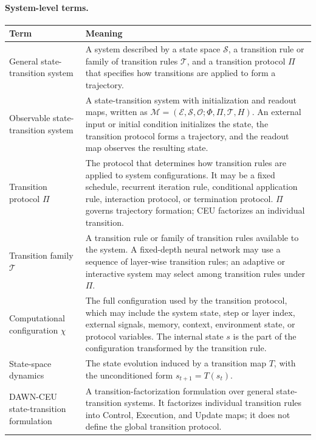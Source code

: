 \documentclass{article}
\begin{document}
\par\medskip
\noindent\begin{minipage}{\textwidth}
\paragraph{System-level terms.}
\vspace{-0.35em}
\begin{center}
\small
\setlength{\tabcolsep}{5pt}
\renewcommand{\arraystretch}{1.06}
\begin{tabularx}{\textwidth}{lX}
\toprule
\textbf{Term} & \textbf{Meaning} \\
\midrule
General state-transition system & A system described by a state space \(\mathcal{S}\), a transition rule or family of transition rules \(\mathcal{T}\), and a transition protocol \(\Pi\) that specifies how transitions are applied to form a trajectory. \\
Observable state-transition system & A state-transition system with initialization and readout maps, written as \(\mathcal{M}=(\mathcal{E},\mathcal{S},\mathcal{O};\Phi,\Pi,\mathcal{T},H)\). An external input or initial condition initializes the state, the transition protocol forms a trajectory, and the readout map observes the resulting state. \\
Transition protocol \(\Pi\) & The protocol that determines how transition rules are applied to system configurations. It may be a fixed schedule, recurrent iteration rule, conditional application rule, interaction protocol, or termination protocol. \(\Pi\) governs trajectory formation; CEU factorizes an individual transition. \\
Transition family \(\mathcal{T}\) & A transition rule or family of transition rules available to the system. A fixed-depth neural network may use a sequence of layer-wise transition rules; an adaptive or interactive system may select among transition rules under \(\Pi\). \\
Computational configuration \(\chi\) & The full configuration used by the transition protocol, which may include the system state, step or layer index, external signals, memory, context, environment state, or protocol variables. The internal state \(s\) is the part of the configuration transformed by the transition rule. \\
State-space dynamics & The state evolution induced by a transition map \(T\), with the unconditioned form \(s_{t+1}=T(s_t)\). \\
DAWN-CEU state-transition formulation & A transition-factorization formulation over general state-transition systems. It factorizes individual transition rules into Control, Execution, and Update maps; it does not define the global transition protocol. \\

\end{tabularx}
\end{center}
\end{minipage}
\end{document}
